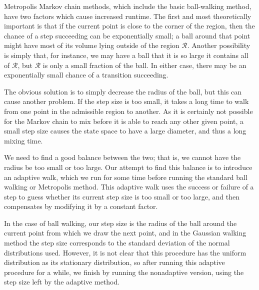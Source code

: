 \documentclass[11pt]{article}
\begin{document}
Metropolis Markov chain methods, which include the basic ball-walking method, have two factors which cause increased runtime. The first and most theoretically important is that if the current point is close to the corner of the region, then the chance of a step succeeding can be exponentially small; a ball around that point might have most of its volume lying outside of the region $\mathcal R$. Another possibility is simply that, for instance, we may have a ball that it is so large it contains all of $\mathcal R$, but $\mathcal R$ is only a small fraction of the ball. In either case, there may be an exponentially small chance of a transition succeeding.



The obvious solution is to simply decrease the radius of the ball, but this can cause another problem. If the step size is too small, it takes a long time to walk from one point in the admissible region to another. As it is certainly not possible for the Markov chain to mix before it is able to reach any other given point, a small step size causes the state space to have a large diameter, and thus a long mixing time.

We need to find a good balance between the two; that is, we cannot have the radius be too small or too large. Our attempt to find this balance is to introduce an adaptive walk, which we run for some time before running the standard ball walking or Metropolis method. This adaptive walk uses the success or failure of a step to guess whether its current step size is too small or too large, and then compensates by modifying it by a constant factor.

In the case of ball walking, our step size is the radius of the ball around the current point from which we draw the next point, and in the Gaussian walking method the step size corresponds to the standard deviation of the normal distributions used. However, it is not clear that this procedure has the uniform distribution as its stationary distribution, so after running this adaptive procedure for a while, we finish by running the nonadaptive version, using the step size left by the adaptive method.
\end{document}
